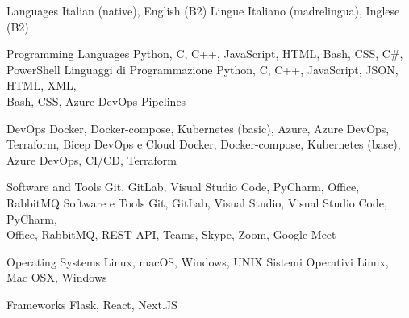 \begin{cvskills}    
\ifenglish
\cvskill
    {Languages} %
    {Italian (native), English (B2)}
\else
\cvskill
    {Lingue} %
    {Italiano (madrelingua), Inglese (B2)}
\fi
\end{cvskills}




\begin{cvskills}


\ifenglish
\cvskill
{Programming Languages} %
{Python, C, C++, JavaScript, HTML, Bash, CSS, C\#, PowerShell} %
\else
\cvskill
{Linguaggi di Programmazione} %
{Python, C, C++, JavaScript, JSON, HTML, XML,\\
 Bash, CSS, Azure DevOps Pipelines} %
\fi


\ifenglish
\cvskill
{DevOps} %
{Docker, Docker-compose, Kubernetes (basic), Azure, Azure DevOps, Terraform, Bicep} %
\else
\cvskill
{DevOps e Cloud} %
{Docker, Docker-compose, Kubernetes (base),\\
 Azure DevOps, CI/CD, Terraform} %
\fi


\ifenglish
\cvskill
{Software and Tools} %
{Git, GitLab, Visual Studio Code, PyCharm, Office, RabbitMQ} %
\else
\cvskill
{Software e Tools} %
{Git, GitLab, Visual Studio, Visual Studio Code, PyCharm,\\
 Office, RabbitMQ, REST API, Teams, Skype, Zoom, Google Meet} %
\fi


\ifenglish
\cvskill
{Operating Systems} %
{Linux, macOS, Windows, UNIX} %
\else
\cvskill
{Sistemi Operativi} %
{Linux, Mac OSX, Windows} %
\fi


\cvskill
{Frameworks} %
{Flask, React, Next.JS} %


\end{cvskills}